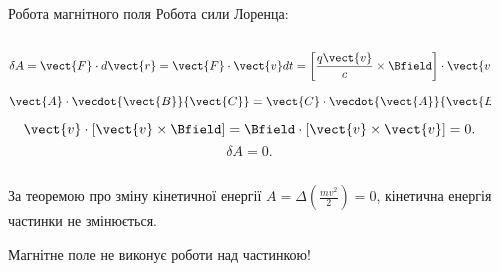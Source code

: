 \documentclass{beamer}
\begin{document}
\begin{frame}{Робота магнітного поля}{}
	Робота сили Лоренца:
	\begin{columns}
		\begin{column}{0.65\linewidth}
			\begin{equation*}
				\delta A = \vect{F}\cdot d\vect{r} = \vect{F}\cdot\vect{v}dt = \left[\frac{q \vect{v}}{c}\times\Bfield\right] \cdot\vect{v}dt.
			\end{equation*}
			\begin{block}{}
				\begin{equation*}
					\vect{A}\cdot\vecdot{\vect{B}}{\vect{C}} = \vect{C}\cdot\vecdot{\vect{A}}{\vect{B}}.
				\end{equation*}
			\end{block}
			\begin{equation*}
				\vect{v}\cdot\left[\vect{v}\times\Bfield\right] = \Bfield\cdot\left[\vect{v}\times\vect{v}\right] = 0.
			\end{equation*}
			\begin{equation*}
				\delta A = 0.
			\end{equation*}
		\end{column}
		\begin{column}{0.35\linewidth}\centering
			
		\end{column}
	\end{columns}
	\begin{block}{}
		За теоремою про зміну кінетичної енергії $A = \Delta\left(\frac{mv^2}{2}\right) = 0$, кінетична енергія частинки не змінюється.
	\end{block}
	\begin{alertblock}{}\centering
		Магнітне поле не виконує роботи над частинкою!
	\end{alertblock}
\end{frame}
\end{document}
